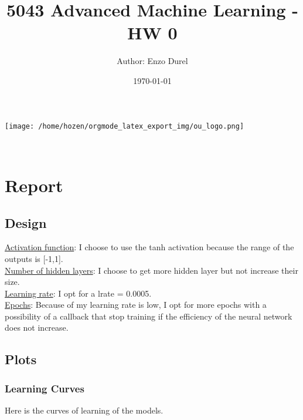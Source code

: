 \documentclass[11pt]{article}
\author{Author: Enzo Durel \newline }
\date{\today}
\title{5043 Advanced Machine Learning - HW 0}
\begin{document}
\maketitle


\begin{center}
\texttt{[image: /home/hozen/orgmode\_latex\_export\_img/ou\_logo.png]}
\end{center}\\[0pt]

\thispagestyle{empty}
\setcounter{tocdepth}{3}
\tableofcontents
\clearpage
{}

\thispagestyle{empty}
\listoffigures
\clearpage
{} 

\newpage

\section{Report}
\label{sec:orgf58578d}
\subsection{Design}
\label{sec:org1aaadd1}

\noindent \uline{Activation function}: I choose to use the tanh activation because the range of the outputs is [-1,1].\\[0pt]
\uline{Number of hidden layers}: I choose to get more hidden layer but not increase their size.\\[0pt]
\uline{Learning rate}: I opt for a lrate = 0.0005.\\[0pt]
\uline{Epochs}: Because of my learning rate is low, I opt for more epochs with a possibility of a callback that stop training if the efficiency of the neural network does not increase.\\[0pt]

\subsection{Plots}
\label{sec:orgeecdf26}
\subsubsection{Learning Curves}
\label{sec:org3e5c61b}

Here is the curves of learning of the models.\\[0pt]
\end{document}
